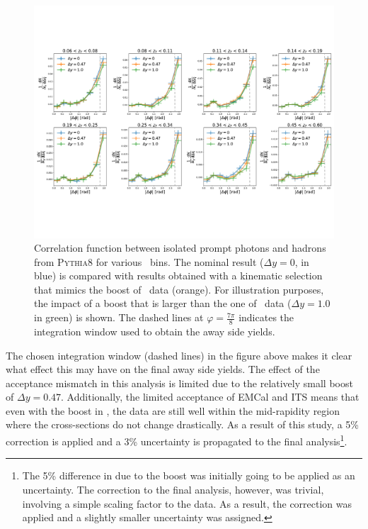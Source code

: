 \begin{figure}
\centering
\includegraphics[width = 1.0 \textwidth]{Checks_Systematics/PythiaStudyBoost_wLines}
\caption{Correlation function between isolated prompt photons and hadrons from \textsc{Pythia8} for various \zt~bins. The nominal result ($\Delta y =0$, in blue) is compared with results obtained with a kinematic selection that mimics the boost of \pPb~data (orange). For illustration purposes, the impact of a boost that is larger than the one of \pPb~data ($\Delta y = 1.0$ in green) is shown. The dashed lines at $\varphi = \frac{7\pi}{8} $ indicates the integration window used to obtain the away side yields.}
\label{fig:PythiaBoostStudy}
\end{figure}

The chosen integration window (dashed lines) in the figure above makes it clear what effect this may have on the final away side yields. The effect of the acceptance mismatch in this analysis is limited due to the relatively small boost of $\Delta y = 0.47$. Additionally, the limited acceptance of EMCal and ITS means that even with the boost in \pPb, the data are still well within the mid-rapidity region where the cross-sections do not change drastically. As a result of this study, a 5\% correction is applied and a 3\% uncertainty is propagated to the final analysis\footnote{The 5\% difference in \pPb due to the boost was initially going to be applied as an uncertainty. The correction to the final analysis, however, was trivial, involving a simple scaling factor to the  \pPb data. As a result, the correction was applied and a slightly smaller uncertainty was assigned.}.


